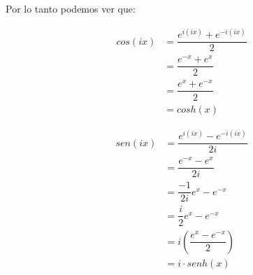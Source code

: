 \documentclass[12pt, fleqn]{report}                             %
\newcommand{\Wrap}[1]{\left( #1 \right)}                        %
\newcommand{\pfrac}[2]{\Wrap{\dfrac{#1}{#2}}}                   %
\newenvironment{MultiLineEquation}[1]                           %
        {\begin{equation}\begin{alignedat}{#1}}                     %
        {\end{alignedat}\end{equation}}                             %
\begin{document}
            Por lo tanto podemos ver que:

            \begin{MultiLineEquation}{2}
                cos(ix) &= \dfrac{ e^{i(ix)} + e^{-i(ix)} }{2}  \\
                        &= \dfrac{ e^{-x} + e^x }{2}            \\
                        &= \dfrac{ e^x + e^{-x} }{2}            \\
                        &= cosh(x) 
            \end{MultiLineEquation}

            \begin{MultiLineEquation}{2}
                sen(ix) &= \dfrac{ e^{i(ix)} - e^{-i(ix)} }{2i} \\
                        &= \dfrac{ e^{-x} - e^x }{2i}           \\
                        &= \dfrac{-1}{2i} e^x - e^{-x}          \\
                        &= \dfrac{i}{2} e^x - e^{-x}            \\
                        &= i\pfrac{e^x - e^{-x}}{2}             \\
                        &= i \cdot senh(x) 
            \end{MultiLineEquation}


            \clearpage
\end{document}
